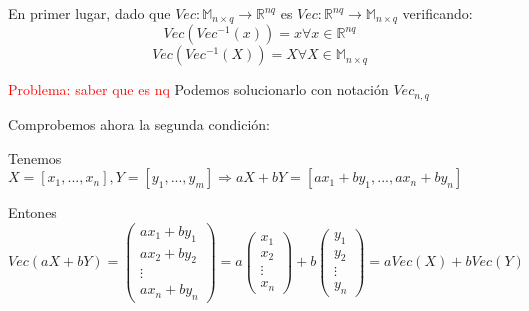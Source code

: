 \documentclass{article}
\theoremstyle{theorem-style}  %
\theoremstyle{definition-style}
\theoremstyle{example-style}
\theoremstyle{exercise-style}
\begin{document}
	En primer lugar, dado que $Vec: \mathbb{M}_{n\times q} \rightarrow \mathbb{R}^{nq}$ es $Vec: \mathbb{R}^{nq} \rightarrow \mathbb{M}_{n\times q}$ verificando:
	$$Vec(Vec^{-1}(x))=x \forall x \in \mathbb{R}^{nq}$$
	$$Vec(Vec^{-1}(X))=X \forall X \in \mathbb{M}_{n\times q}$$
	
	\textcolor{red}{Problema: saber que es nq}
	Podemos solucionarlo con notación $Vec_{n,q}$
	
	Comprobemos ahora la segunda condición:
	
	Tenemos $X=[x_1,...,x_n], Y=[y_1,...,y_m] \Rightarrow aX+bY=[ax_1+by_1,...,ax_n+by_n]$
	
	Entones $Vec(aX+bY)= \left({\begin{array}{c}
		ax_1+by_1\\
		ax_2+by_2\\
		\vdots \\
		ax_n+by_n
		\end{array} } \right) = a \left({\begin{array}{c}
		x_1\\ x_2\\ \vdots \\ x_n \end{array} } \right) + b \left({\begin{array}{c}
		y_1\\ y_2\\ \vdots \\ y_n \end{array} } \right) = aVec(X)+bVec(Y)$ 
	
\end{document}
